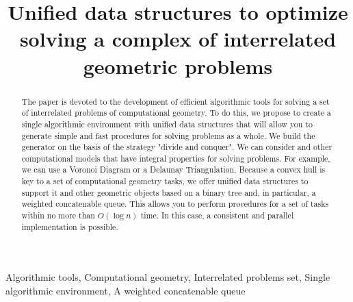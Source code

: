 \documentclass[conference]{IEEEtran}
\theoremstyle{plane}
\begin{document}
\title{Unified data structures to optimize solving a complex of interrelated geometric problems\\
}
\author{
\and
{}
}
\maketitle

\begin{abstract}
The paper is devoted to the development of efficient algorithmic tools for solving a set of interrelated problems of computational geometry. To do this, we propose to create a single algorithmic environment with unified data structures that will allow you to generate simple and fast procedures for solving problems as a whole. We build the generator on the basis of the strategy "divide and conquer". We can consider and other computational models that have integral properties for solving problems. For example, we can use a Voronoi Diagram or a Delaunay Triangulation.
Because a convex hull is key to a set of computational geometry tasks, we offer unified data structures to support it and other geometric objects based on a binary tree and, in particular, a weighted concatenable queue. This allows you to perform procedures for a set of tasks within no more than 
$O(\log n)$ time. In this case, a consistent and parallel implementation is possible.
\end{abstract}

\begin{IEEEkeywords}
Algorithmic tools,   Computational geometry, Interrelated problems set, Single algorithmic environment, A weighted concatenable queue
\end{IEEEkeywords}
\end{document}
